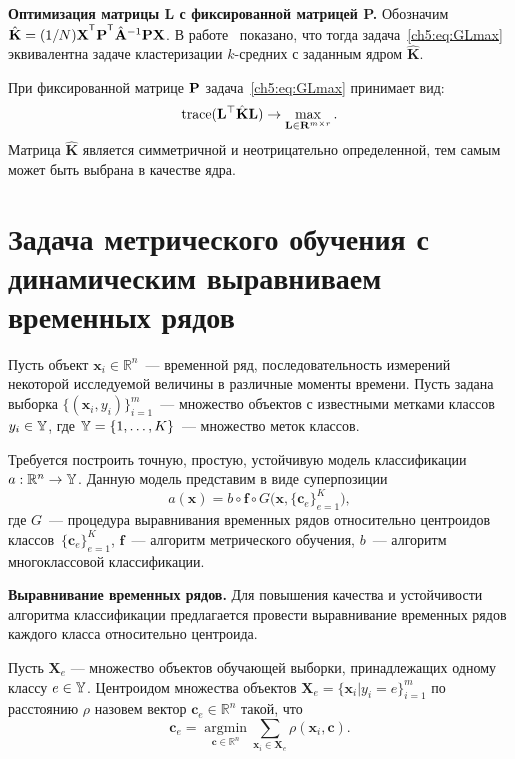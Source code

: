 \textbf{Оптимизация матрицы L с фиксированной матрицей P.}
Обозначим $\hat{\mathbf{K}} = (1/N)\bX^{\T} \bP^{\T} \hat{\mathbf{A}}^{-1} \bP \bX$.
В работе~\cite{shawe2004kernel} показано, что тогда задача~\eqref{ch5:eq:GLmax} эквивалентна задаче кластеризации $k$-средних с заданным ядром $\hat{\mathbf{K}}$.

При фиксированной матрице $\mathbf{P}$ задача~\eqref{ch5:eq:GLmax} принимает вид:
\begin{equation*}
	\text{trace} (\mathbf{L}^{\top} \hat{\mathbf{K}} \mathbf{L}) \to \max_{\mathbf{L} \in \mathbf{R}^{m \times r}}.
\end{equation*}
Матрица $\hat{\mathbf{K}}$ является симметричной и неотрицательно определенной, тем самым может быть выбрана в качестве ядра.

\section{Задача метрического обучения с динамическим выравниваем временных рядов}
\label{sec:ch5:metric_learning_classification}

Пусть объект $\mathbf{x}_i \in \mathbb{R}^n$~--- временной ряд, последовательность измерений некоторой исследуемой величины в различные моменты времени.
Пусть задана выборка $\{(\mathbf{x}_i, y_i)\}_{i=1}^m$~--- множество объектов с известными метками классов $y_i \in \mathbb{Y}$, где $\mathbb{Y} = \{1, \dots, K\}$~--- множество меток классов.

Требуется построить точную, простую, устойчивую модель классификации $a: \mathbb{R}^n \to \mathbb{Y}$.
Данную модель представим в виде суперпозиции
\begin{equation*}
	a(\mathbf{x}) = b \circ \mathbf{f} \circ G\bigl(\mathbf{x}, \{\mathbf{c}_e\}_{e = 1} ^ K\bigr),
\end{equation*}
где $G$~--- процедура выравнивания временных рядов относительно центроидов классов~$\{\mathbf{c}_e\}_{e = 1} ^ K$, $\mathbf{f}$~--- алгоритм метрического обучения, $b$~--- алгоритм многоклассовой классификации.

\textbf{Выравнивание временных рядов.}
Для повышения качества и устойчивости алгоритма классификации предлагается провести выравнивание временных рядов каждого класса относительно центроида.

Пусть $\mathbf{X}_e$ --- множество объектов обучающей выборки, принадлежащих одному классу $e \in \mathbb{Y}$.
Центроидом множества объектов $\mathbf{X}_e = \{\mathbf{x}_i|y_i=e\}_{i=1}^m$ по расстоянию $\rho$ назовем вектор $\mathbf{c}_e \in \mathbb{R}^n$ такой, что
\begin{equation}
	\label{ch5:eq:centroid_task}
	\mathbf{c}_e = \mathop{\text{argmin}}\limits_{{\mathbf{c} \in \mathbb{R}^n}}\sum_{\mathbf{x}_i \in \mathbf{X}_e}
	{\rho(\mathbf{x}_i ,\mathbf{c})}.
\end{equation}

